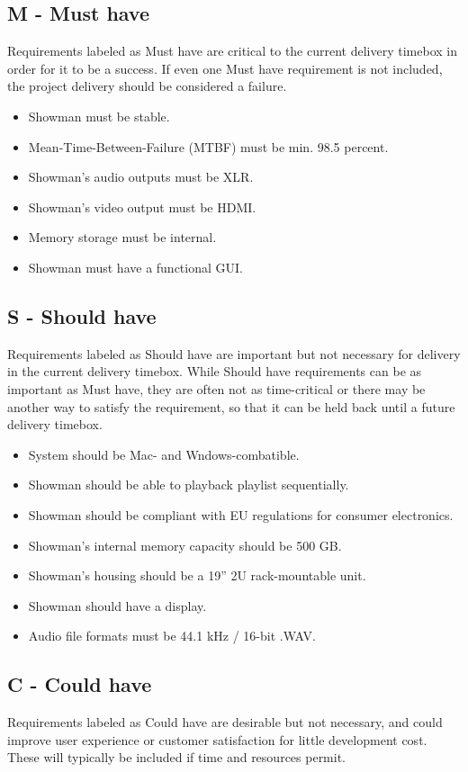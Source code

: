 \subsection{M - Must have}
Requirements labeled as Must have are critical to the current delivery timebox in order for it to be a success. If even one Must have requirement is not included, the project delivery should be considered a failure. \\

\begin{itemize}
\item Showman must be stable.
\item Mean-Time-Between-Failure (MTBF) must be min. 98.5 percent.
\item Showman's audio outputs must be XLR.
\item Showman's video output must be HDMI.
\item Memory storage must be internal.
\item Showman must have a functional GUI.
\end{itemize}

\subsection{S - Should have}
Requirements labeled as Should have are important but not necessary for delivery in the current delivery timebox. While Should have requirements can be as important as Must have, they are often not as time-critical or there may be another way to satisfy the requirement, so that it can be held back until a future delivery timebox. \\

\begin{itemize}
\item System should be Mac- and Wndows-combatible.
\item Showman should be able to playback playlist sequentially.
\item Showman should be compliant with EU regulations for consumer electronics.
\item Showman's internal memory capacity should be 500 GB.
\item Showman's housing should be a 19'' 2U rack-mountable unit.
\item Showman should have a display.
\item Audio file formats must be 44.1 kHz / 16-bit .WAV.
\end{itemize}

\subsection{C - Could have}
Requirements labeled as Could have are desirable but not necessary, and could improve user experience or customer satisfaction for little development cost. These will typically be included if time and resources permit. \\

